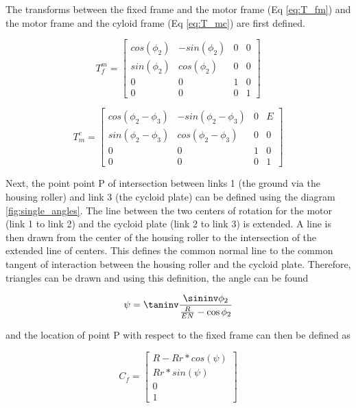 The transforms between the fixed frame and the motor frame (Eq \ref{eq:T_fm}) and the motor frame and the cyloid frame (Eq \ref{eq:T_mc}) are first defined. 

\begin{equation} \label{eq:T_fm}
T_f^m = \left[{\begin{array}{cccc}
		cos(\phi_2) & -sin(\phi_2) & 0 & 0\\
		sin(\phi_2) & cos(\phi_2) & 0 & 0\\
		0 & 0 & 1 & 0\\
		0 & 0 & 0 & 1 \end{array} } \right]
\end{equation}

\begin{equation} \label{eq:T_mc}
T_m^c = \left[{\begin{array}{cccc}
		cos(\phi_2 - \phi_3) & -sin(\phi_2 - \phi_3) & 0 & E\\
		sin(\phi_2 - \phi_3) & cos(\phi_2 - \phi_3) & 0 & 0\\
		0 & 0 & 1 & 0\\
		0 & 0 & 0 & 1 \end{array} } \right]
\end{equation}

Next, the point point P of intersection between links 1 (the ground via the housing roller) and link 3 (the cycloid plate) can be defined using the diagram \ref{fig:single_angles}. The line between the two centers of rotation for the motor (link 1 to link 2) and the cycloid plate (link 2 to link 3) is extended. A line is then drawn from the center of the housing roller to the intersection of the extended line of centers. This defines the common normal line to the common tangent of interaction between the housing roller and the cycloid plate. Therefore, triangles can be drawn and using this definition, the angle \textpsi can be found 

\begin{equation} \label{eq:psi}
\psi = \taninv\frac{\sininv\phi_2}{\frac{R}{EN} - \cos{\phi_2}}
\end{equation}

and the location of point P with respect to the fixed frame can then be defined as 

\begin{equation} \label{eq:Cf}
C_f = \left[\begin{array}{c}
		R-Rr*cos(\psi)\\
		Rr*sin(\psi)\\
		0\\
		1
		\end{array} \right]
\end{equation}


